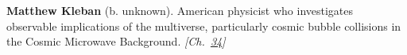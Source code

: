 \textbf{Matthew Kleban} (b. unknown). American physicist who investigates observable implications of the multiverse, particularly cosmic bubble collisions in the Cosmic Microwave Background. \emph{[Ch.~\hyperref[ch:boltzmannbrain]{34}]}

